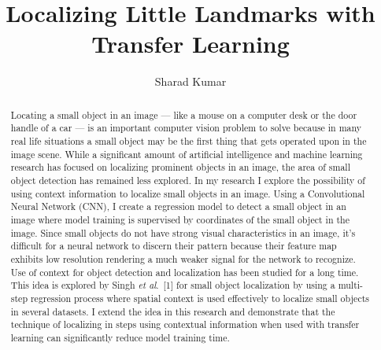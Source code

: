 \documentclass [11pt,letterpaper ,twoside ,openany ]{report}
\title{Localizing Little Landmarks with Transfer Learning}
\author{Sharad Kumar}
\begin{document}
  \maketitle
  \tableofcontents

    \begin{abstract}
    Locating a small object in an image --- like a mouse on a computer desk or the door handle of a car --- is an important computer vision problem to solve because in many real life situations a small object may be the first thing that gets operated upon in the image scene. While a significant amount of artificial intelligence and machine learning research has focused on localizing prominent objects in an image, the area of small object detection has remained less explored. In my research I explore the possibility of using context information to localize small objects in an image. Using a Convolutional Neural Network (CNN), I create a regression model to detect a small object in an image where model training is supervised by coordinates of the small object in the image. Since small objects do not have strong visual characteristics in an image, it's difficult for a neural network to discern their pattern because their feature map exhibits low resolution rendering a much weaker signal for the network to recognize. Use of context for object detection and localization has been studied for a long time. This idea is explored by Singh \textit{et al}.\ [1] for small object localization by using a multi-step regression process where  spatial context is used effectively to localize small objects in several datasets. I extend the idea in this research and demonstrate that the technique of localizing in steps using contextual information when used with transfer learning can significantly reduce model training time.
    \end{abstract}    

    \listoffigures
    \listoftables
\end{document}
